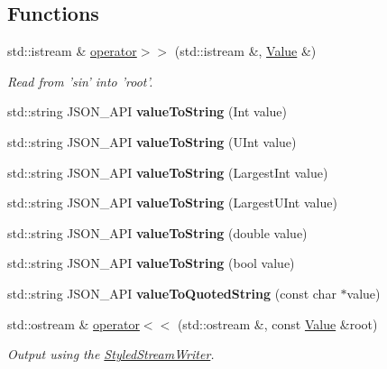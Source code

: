 \subsection*{Functions}
\begin{DoxyCompactItemize}
\item 
std\-::istream \& \hyperlink{namespace_json_a4d245ef719cc0853e8e78eb5f99c16e5}{operator$>$$>$} (std\-::istream \&, \hyperlink{class_json_1_1_value}{Value} \&)
\begin{DoxyCompactList}\small\item\em Read from 'sin' into 'root'. \end{DoxyCompactList}\item 
\hypertarget{namespace_json_a5d3eba6789f9a9c1ab563ff8b4a5090f}{std\-::string J\-S\-O\-N\-\_\-\-A\-P\-I {\bfseries value\-To\-String} (Int value)}\label{namespace_json_a5d3eba6789f9a9c1ab563ff8b4a5090f}

\item 
\hypertarget{namespace_json_a4d43b0ff222bd3975bcf1babca0b978f}{std\-::string J\-S\-O\-N\-\_\-\-A\-P\-I {\bfseries value\-To\-String} (U\-Int value)}\label{namespace_json_a4d43b0ff222bd3975bcf1babca0b978f}

\item 
\hypertarget{namespace_json_abd9c650f70d9434f98f9025e2e2faf2d}{std\-::string J\-S\-O\-N\-\_\-\-A\-P\-I {\bfseries value\-To\-String} (Largest\-Int value)}\label{namespace_json_abd9c650f70d9434f98f9025e2e2faf2d}

\item 
\hypertarget{namespace_json_a3f46b0bc62b95a9426a2da0117bdf9f0}{std\-::string J\-S\-O\-N\-\_\-\-A\-P\-I {\bfseries value\-To\-String} (Largest\-U\-Int value)}\label{namespace_json_a3f46b0bc62b95a9426a2da0117bdf9f0}

\item 
\hypertarget{namespace_json_a99995d7dafa4f4970b349d7d3c8d1d99}{std\-::string J\-S\-O\-N\-\_\-\-A\-P\-I {\bfseries value\-To\-String} (double value)}\label{namespace_json_a99995d7dafa4f4970b349d7d3c8d1d99}

\item 
\hypertarget{namespace_json_a979ed531f091985e22f0051cd2a8e341}{std\-::string J\-S\-O\-N\-\_\-\-A\-P\-I {\bfseries value\-To\-String} (bool value)}\label{namespace_json_a979ed531f091985e22f0051cd2a8e341}

\item 
\hypertarget{namespace_json_aa0c8235a4a5c6599da5d3332743db8ac}{std\-::string J\-S\-O\-N\-\_\-\-A\-P\-I {\bfseries value\-To\-Quoted\-String} (const char $\ast$value)}\label{namespace_json_aa0c8235a4a5c6599da5d3332743db8ac}

\item 
std\-::ostream \& \hyperlink{namespace_json_a87bc83d7e90fc666d28aa16727deda2f}{operator$<$$<$} (std\-::ostream \&, const \hyperlink{class_json_1_1_value}{Value} \&root)
\begin{DoxyCompactList}\small\item\em Output using the \hyperlink{class_json_1_1_styled_stream_writer}{Styled\-Stream\-Writer}. \end{DoxyCompactList}\end{DoxyCompactItemize}


